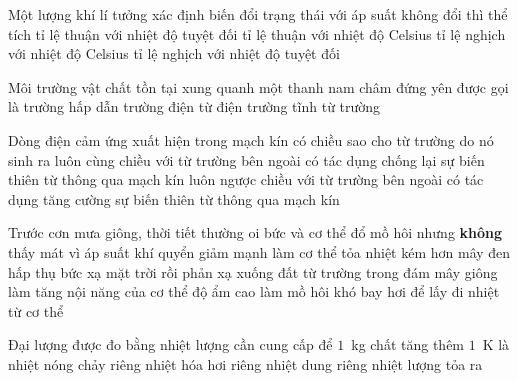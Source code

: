 	\begin{ex}%
		Một lượng khí lí tưởng xác định biến đổi trạng thái với áp suất không đổi thì thể tích
		\choice
		{\True tỉ lệ thuận với nhiệt độ tuyệt đối}
		{tỉ lệ thuận với nhiệt độ Celsius}
		{tỉ lệ nghịch với nhiệt độ Celsius}
		{tỉ lệ nghịch với nhiệt độ tuyệt đối}
	\end{ex}

	\begin{ex}%
		Môi trường vật chất tồn tại xung quanh một thanh nam châm đứng yên được gọi là
		\choice
		{trường hấp dẫn}
		{trường điện từ}
		{điện trường tĩnh}
		{\True từ trường}
	\end{ex}

	\begin{ex}%
		Dòng điện cảm ứng xuất hiện trong mạch kín có chiều sao cho từ trường do nó sinh ra
		\choice
		{luôn cùng chiều với từ trường bên ngoài}
		{\True có tác dụng chống lại sự biến thiên từ thông qua mạch kín}
		{luôn ngược chiều với từ trường bên ngoài}
		{có tác dụng tăng cường sự biến thiên từ thông qua mạch kín}
	\end{ex}

	\begin{ex}%
		Trước cơn mưa giông, thời tiết thường oi bức và cơ thể đổ mồ hôi nhưng \textbf{không} thấy mát vì
		\choice
		{áp suất khí quyển giảm mạnh làm cơ thể tỏa nhiệt kém hơn}
		{mây đen hấp thụ bức xạ mặt trời rồi phản xạ xuống đất}
		{từ trường trong đám mây giông làm tăng nội năng của cơ thể}
		{\True độ ẩm cao làm mồ hôi khó bay hơi để lấy đi nhiệt từ cơ thể}
	\end{ex}

	\begin{ex}%
		Đại lượng được đo bằng nhiệt lượng cần cung cấp để $1$~kg chất tăng thêm $1$~K là
		\choice
		{nhiệt nóng chảy riêng}
		{nhiệt hóa hơi riêng}
		{\True nhiệt dung riêng}
		{nhiệt lượng tỏa ra}
	\end{ex}

